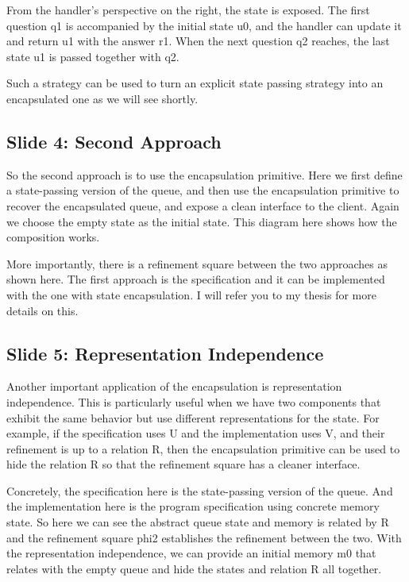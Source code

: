 \documentclass{article}
\begin{document}
From the handler's perspective on the right, the state is exposed. The first
question q1 is accompanied by the initial state u0, and the handler can update
it and return u1 with the answer r1. When the next question q2 reaches, the last
state u1 is passed together with q2.

Such a strategy can be used to turn an explicit state passing strategy into an
encapsulated one as we will see shortly.

\subsection{Slide 4: Second Approach}

So the second approach is to use the encapsulation primitive.
Here we first define a state-passing version of the queue,
and then use the encapsulation primitive to recover the encapsulated queue,
and expose a clean interface to the client.
Again we choose the empty state as the initial state.
This diagram here shows how the composition works.

More importantly, there is a refinement square between the two approaches as
shown here. The first approach is the specification and it can be implemented
with the one with state encapsulation. I will refer you to my thesis for more
details on this.

\subsection{Slide 5: Representation Independence}

Another important application of the encapsulation is representation
independence. This is particularly useful when we have two components that
exhibit the same behavior but use different representations for the state. For
example, if the specification uses U and the implementation uses V, and their
refinement is up to a relation R, then the encapsulation primitive can be used to
hide the relation R so that the refinement square has a cleaner interface.

Concretely, the specification here is the state-passing version of the queue.
And the implementation here is the program specification using concrete memory
state. So here we can see the abstract queue state and memory is related by R
and the refinement square phi2 establishes the refinement between the two. With
the representation independence, we can provide an initial memory m0 that
relates with the empty queue and hide the states and relation R all together.
\end{document}
